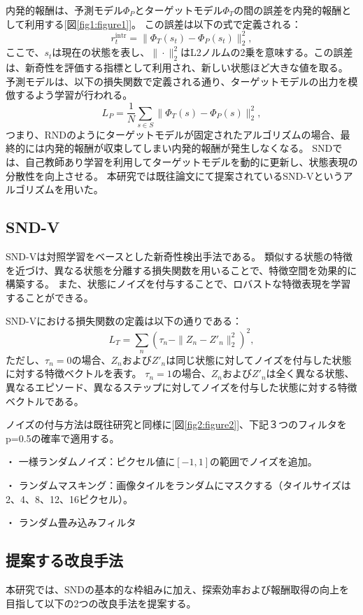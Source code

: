 内発的報酬は、予測モデル\(\Phi_P\)とターゲットモデル\(\Phi_T\)の間の誤差を内発的報酬として利用する[図\ref{fig1:figure1}]。
この誤差は以下の式で定義される：
\[
 r^{\text{intr}}_{t} = \| \Phi_T(s_t) - \Phi_P(s_t) \|_2^2,
\]
ここで、\(s_t\)は現在の状態を表し、\(\|\cdot\|_2^2\)はL2ノルムの2乗を意味する。この誤差は、新奇性を評価する指標として利用され、新しい状態ほど大きな値を取る。
予測モデルは、以下の損失関数で定義される通り、ターゲットモデルの出力を模倣するよう学習が行われる。
\[
 L_P = \frac{1}{N} \sum_{s \in S} \| \Phi_T(s) - \Phi_P(s) \|_2^2,
\]
つまり、RNDのようにターゲットモデルが固定されたアルゴリズムの場合、最終的には内発的報酬が収束してしまい内発的報酬が発生しなくなる。
SNDでは、自己教師あり学習を利用してターゲットモデルを動的に更新し、状態表現の分散性を向上させる。
本研究では既往論文にて提案されているSND-Vというアルゴリズムを用いた。

\subsection{SND-V}
SND-Vは対照学習をベースとした新奇性検出手法である。
類似する状態の特徴を近づけ、異なる状態を分離する損失関数を用いることで、特徴空間を効果的に構築する。
また、状態にノイズを付与することで、ロバストな特徴表現を学習することができる。

SND-Vにおける損失関数の定義は以下の通りである：
\[
 L_T = \sum_{n} (\tau_n - \| Z_n - Z'_n \|_2^2)^2,
\]
ただし、\(\tau_n = 0\)の場合、\(Z_n\)および\(Z'_n\)は同じ状態に対してノイズを付与した状態に対する特徴ベクトルを表す。
\(\tau_n = 1\)の場合、\(Z_n\)および\(Z'_n\)は全く異なる状態、異なるエピソード、異なるステップに対してノイズを付与した状態に対する特徴ベクトルである。

ノイズの付与方法は既往研究と同様に[図\ref{fig2:figure2}]、下記３つのフィルタをp=0.5の確率で適用する。

・ 一様ランダムノイズ：ピクセル値に\([-1, 1]\)の範囲でノイズを追加。

・ ランダムマスキング：画像タイルをランダムにマスクする（タイルサイズは2、4、8、12、16ピクセル）。

・ ランダム畳み込みフィルタ

\subsection{提案する改良手法}
本研究では、SNDの基本的な枠組みに加え、探索効率および報酬取得の向上を目指して以下の2つの改良手法を提案する。

